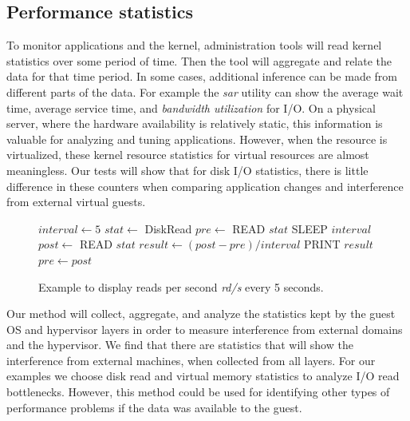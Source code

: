 \subsection{Performance statistics}
To monitor applications and the kernel, administration tools will read kernel statistics over some period of time.  Then the tool will aggregate and relate the data for that time period.  In some cases, additional inference can be made from different parts of the data.  For example the \emph{sar} utility can show the average wait time, average service time, and \emph{bandwidth utilization} for I/O.  On a physical server, where the hardware availability is relatively static, this information is valuable for analyzing and tuning applications.  However, when the resource is virtualized, these kernel resource statistics for virtual resources are almost meaningless.  Our tests will show that for disk I/O statistics, there is little difference in these counters when comparing application changes and interference from external virtual guests. 

\begin{figure}[h]
\begin{algorithmic}[H]
 \STATE $interval \gets 5$
 \STATE $stat \gets$  DiskRead       
 \STATE $pre \gets $ READ $stat$ 
 \LOOP
    \STATE SLEEP $interval$
    \STATE $post \gets$ READ $stat$
    \STATE $result \gets (post - pre)/interval$
    \STATE PRINT  $result$
    \STATE $pre \gets post$ 
 \ENDLOOP
\end{algorithmic}
\caption{Example to display reads per second \emph{rd/s} every 5 seconds.}
\label{alg1}
\end{figure}

Our method will collect, aggregate, and analyze the statistics kept by the guest OS and hypervisor layers in order to measure interference from external domains and the hypervisor.  We find that there are statistics that will show the interference from external machines, when collected from all layers.  For our examples we choose disk read and virtual memory statistics to analyze I/O read bottlenecks.  However, this method could be used for identifying other types of performance problems if the data was available to the guest.

